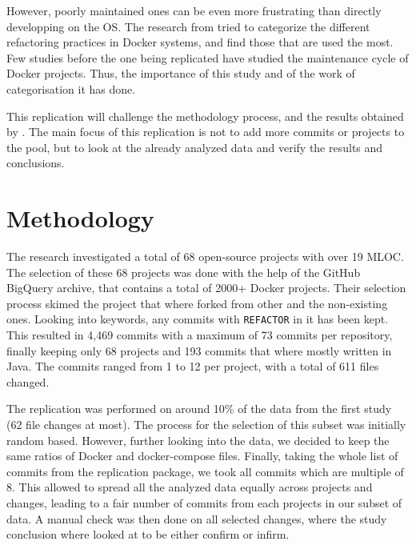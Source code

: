 \documentclass[lettersize,journal]{IEEEtran}
\begin{document}
However, poorly maintained ones can be even more frustrating than directly developping on the OS.
The research from \cite{1} tried to categorize the different refactoring practices in Docker systems, and find those that are used the most.
Few studies before the one being replicated have studied the maintenance cycle of Docker projects.
Thus, the importance of this study and of the work of categorisation it has done.

This replication will challenge the methodology process, and the results obtained by \cite{1}.
The main focus of this replication is not to add more commits or projects to the pool, but to look at the already analyzed data and verify the results and conclusions.

\section{Methodology}\label{sec:methodology}

The research investigated a total of 68 open-source projects with over 19 MLOC.
The selection of these 68 projects was done with the help of the GitHub BigQuery archive, that contains a total of 2000+ Docker projects.
Their selection process skimed the project that where forked from other and the non-existing ones.
Looking into keywords, any commits with \texttt{REFACTOR} in it has been kept.
This resulted in 4,469 commits with a maximum of 73 commits per repository, finally keeping only 68 projects and 193 commits that where mostly written in Java.
The commits ranged from 1 to 12 per project, with a total of 611 files changed.

The replication was performed on around 10\% of the data from the first study (62 file changes at most).
The process for the selection of this subset was initially random based.
However, further looking into the data, we decided to keep the same ratios of Docker and docker-compose files.
Finally, taking the whole list of commits from the replication package, we took all commits which are multiple of 8.
This allowed to spread all the analyzed data equally across projects and changes, leading to a fair number of commits from each projects in our subset of data.
A manual check was then done on all selected changes, where the study conclusion where looked at to be either confirm or infirm.
\end{document}
